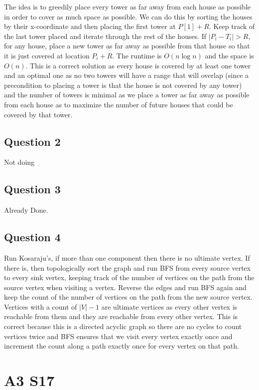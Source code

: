 \documentclass[11pt]{article}
\begin{document}
The idea is to greedily place every tower as far away from each house as possible in order to cover as much space as possible. We can do this by sorting the houses by their x-coordinate and then placing the first tower at $P[1] + R$. Keep track of the last tower placed and iterate through the rest of the houses. If $|P_i - T_i| > R$, for any house, place a new tower as far away as possible from that house so that it is just covered at location $P_i + R$. The runtime is $O(n \log n)$ and the space is $O(n)$. This is a correct solution as every house is covered by at least one tower and an optimal one as no two towers will have a range that will overlap (since a precondition to placing a tower is that the house is not covered by any tower) and the number of towers is minimal as we place a tower as far away as possible from each house as to maximize the number of future houses that could be covered by that tower.

\subsection{Question 2}

Not doing

\subsection{Question 3}

Already Done.

\subsection{Question 4}

Run Kosaraju's, if more than one component then there is no ultimate vertex. If there is, then topologically sort the graph and run BFS from every source vertex to every sink vertex, keeping track of the number of vertices on the path from the source vertex when visiting a vertex. Reverse the edges and run BFS again and keep the count of the number of vertices on the path from the new source vertex. Vertices with a count of $|V| - 1$ are ultimate vertices as every other vertex is reachable from them and they are reachable from every other vertex. This is correct because this is a directed acyclic graph so there are no cycles to count vertices twice and BFS ensures that we visit every vertex exactly once and increment the count along a path exactly once for every vertex on that path.

\section{A3 S17}
\end{document}
